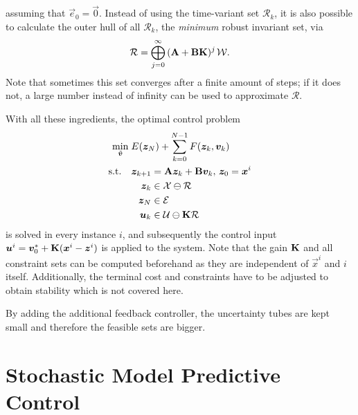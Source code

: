 		assuming that \( \vec{e}_0 = \vec{0} \). Instead of using the time-variant set \(\mathcal{R}_k\), it is also possible to calculate the outer hull of all \(\mathcal{R}_k\), the \emph{minimum} robust invariant set, via
		\begin{equation}
			\mathcal{R} = \bigoplus_{j = 0}^{\infty}\, (\bm{\mathrm{A}} + \bm{\mathrm{B}} \bm{\mathrm{K}})^{j\,} \mathcal{W}.
		\end{equation}
		Note that sometimes this set converges after a finite amount of steps; if it does not, a large number instead of infinity can be used to approximate \(\mathcal{R}\).

		With all these ingredients, the optimal control problem
		\begin{equation}
			\begin{aligned}
				\min_{\tilde{\bm{v}}}\; & E(\bm{z}_N) + \sum_{k = 0}^{N - 1} F(\bm{z}_k, \bm{v}_k) \\
				\text{s.t.}\quad&
					\begin{aligned}[t]
						\bm{z}_{k + 1} &= \bm{\mathrm{A}} \bm{z}_k + \bm{\mathrm{B}} \bm{v}_k,\, \bm{z}_0 = \bm{x}^i \\
						\bm{z}_k &\in \mathcal{X} \ominus \mathcal{R} \\
						\bm{z}_N &\in \mathcal{E} \\
						\bm{u}_k &\in \mathcal{U} \ominus \bm{\mathrm{K}} \mathcal{R}
					\end{aligned}
			\end{aligned}
		\end{equation}
		is solved in every instance \(i\), and subsequently the control input \( \bm{u}^i = \bm{v}_0^\ast + \bm{\mathrm{K}} (\bm{x}^i - \bm{z}^i) \) is applied to the system. Note that the gain \(\bm{\mathrm{K}}\) and all constraint sets can be computed beforehand as they are independent of \(\vec{x}^i\) and \(i\) itself. Additionally, the terminal cost and constraints have to be adjusted to obtain stability which is not covered here.

		By adding the additional feedback controller, the uncertainty tubes are kept small and therefore the feasible sets are bigger.

\chapter{Stochastic Model Predictive Control}
	\label{c:mpcStochastic}

